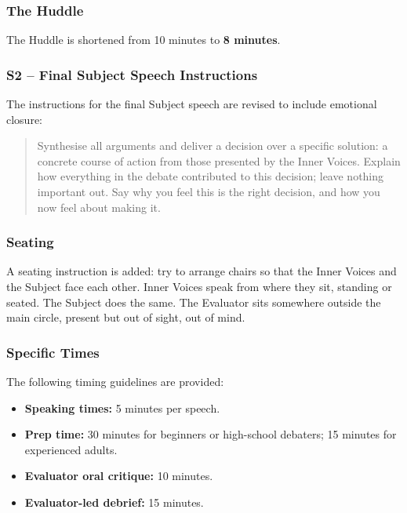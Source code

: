 \documentclass[12pt]{article}
\begin{document}
\subsubsection{The Huddle}

The Huddle is shortened from 10 minutes to \textbf{8 minutes}.

\subsubsection{S2 -- Final Subject Speech Instructions}

The instructions for the final Subject speech are revised to include emotional closure:

\begin{quote}
Synthesise all arguments and deliver a decision over a specific solution: a concrete course of action from those presented by the Inner Voices. Explain how everything in the debate contributed to this decision; leave nothing important out. Say why you feel this is the right decision, and how you now feel about making it.
\end{quote}

\subsubsection{Seating}

A seating instruction is added: try to arrange chairs so that the Inner Voices and the Subject face each other. Inner Voices speak from where they sit, standing or seated. The Subject does the same. The Evaluator sits somewhere outside the main circle, present but out of sight, out of mind.

\subsubsection{Specific Times}

The following timing guidelines are provided:

\begin{itemize}
    \item \textbf{Speaking times:} 5 minutes per speech.
    \item \textbf{Prep time:} 30 minutes for beginners or high-school debaters; 15 minutes for experienced adults.
    \item \textbf{Evaluator oral critique:} 10 minutes.
    \item \textbf{Evaluator-led debrief:} 15 minutes.
\end{itemize}
\end{document}

